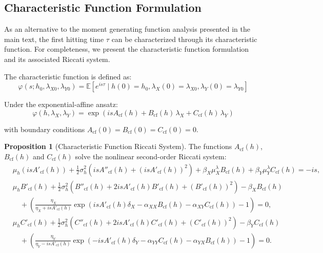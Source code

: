 \documentclass{article}
\theoremstyle{definition}
\newtheorem{proposition}{Proposition}[section]
\begin{document}
\subsection{Characteristic Function Formulation}

As an alternative to the moment generating function analysis presented in the main text, the first hitting time $\tau$ can be characterized through its characteristic function. For completeness, we present the characteristic function formulation and its associated Riccati system.

The characteristic function is defined as:
\begin{equation}
\varphi(s; h_0, \lambda_{X0}, \lambda_{Y0}) = \mathbb{E}[e^{is\tau} \mid h(0) = h_0, \lambda_X(0) = \lambda_{X0}, \lambda_Y(0) = \lambda_{Y0}]
\end{equation}

Under the exponential-affine ansatz:
\begin{equation}
\varphi(h, \lambda_X, \lambda_Y) = \exp\!\left( i s A_{\text{cf}}(h) + B_{\text{cf}}(h)\,\lambda_X + C_{\text{cf}}(h)\,\lambda_Y \right)
\end{equation}

with boundary conditions $A_{\text{cf}}(0) = B_{\text{cf}}(0) = C_{\text{cf}}(0) = 0$.

\begin{proposition}[Characteristic Function Riccati System]
\label{prop:cf_riccati}
The functions $A_{\text{cf}}(h)$, $B_{\text{cf}}(h)$ and $C_{\text{cf}}(h)$ solve the nonlinear second-order Riccati system:
\[
\begin{aligned}
& \mu_h (i s A'_{\text{cf}}(h)) 
+ \frac{1}{2}\sigma_h^2 \left( i s A''_{\text{cf}}(h) + (i s A'_{\text{cf}}(h))^2 \right)
+ \beta_X \mu_X^\lambda B_{\text{cf}}(h) 
+ \beta_Y \mu_Y^\lambda C_{\text{cf}}(h) 
= - i s, \\[1.2ex]
& \mu_h B'_{\text{cf}}(h) 
+ \frac{1}{2}\sigma_h^2 \left( B''_{\text{cf}}(h) + 2 i s A'_{\text{cf}}(h) B'_{\text{cf}}(h) + (B'_{\text{cf}}(h))^2 \right)
- \beta_X B_{\text{cf}}(h) \\
&\quad + \left( \frac{\eta_X}{\eta_X + i s A'_{\text{cf}}(h)} 
\exp\!\left( i s A'_{\text{cf}}(h)\delta_X - \alpha_{XX} B_{\text{cf}}(h) - \alpha_{XY} C_{\text{cf}}(h) \right) - 1 \right) 
= 0, \\[1.2ex]
& \mu_h C'_{\text{cf}}(h) 
+ \frac{1}{2}\sigma_h^2 \left( C''_{\text{cf}}(h) + 2 i s A'_{\text{cf}}(h) C'_{\text{cf}}(h) + (C'_{\text{cf}}(h))^2 \right)
- \beta_Y C_{\text{cf}}(h) \\
&\quad + \left( \frac{\eta_Y}{\eta_Y - i s A'_{\text{cf}}(h)} 
\exp\!\left( -i s A'_{\text{cf}}(h)\delta_Y - \alpha_{YY} C_{\text{cf}}(h) - \alpha_{YX} B_{\text{cf}}(h) \right) - 1 \right) 
= 0.
\end{aligned}
\]
\end{proposition}
\end{document}
